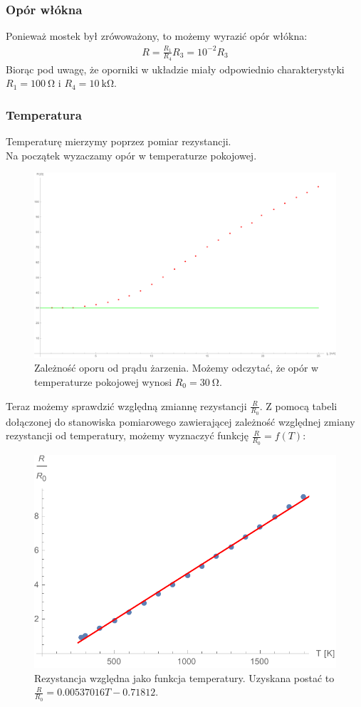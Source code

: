 \documentclass[paper=a4, fontsize=12pt]{scrartcl}
\begin{document}
\subsubsection{Opór włókna}
Ponieważ mostek był zrówoważony, to możemy wyrazić opór włókna:
\begin{align*}
R=\frac{R_1}{R_4}R_3=10^{-2}R_3
\end{align*}
Biorąc pod uwagę, że oporniki w układzie miały odpowiednio charakterystyki $R_1=100\:\mathrm{\Omega}$ i $R_4=10\:\mathrm{k\Omega}$.
\subsubsection{Temperatura}
Temperaturę mierzymy poprzez pomiar rezystancji.\\
Na początek wyzaczamy opór w temperaturze pokojowej.
\begin{figure}
\centering
\includegraphics[width=0.9\linewidth]{rid}
\caption{Zależność oporu od prądu żarzenia. Możemy odczytać, że opór w temperaturze pokojowej wynosi $R_0=30\:\mathrm{\Omega}$.}
\label{fig:rid}
\end{figure}
Teraz możemy sprawdzić względną zmiannę rezystancji $\frac{R}{R_0}$. Z pomocą tabeli dołączonej do stanowiska pomiarowego zawierającej zależność względnej zmiany rezystancji od temperatury, możemy wyznaczyć funkcję $\frac{R}{R_0}=f(T)$:
\begin{figure}[h!]
\centering
\includegraphics[width=0.6\linewidth]{temp}
\caption{Rezystancja względna jako funkcja temperatury. \newline
	Uzyskana postać to $\frac{R}{R_0}=0.00537016T-0.71812$.}
\label{fig:temp}
\end{figure}\clearpage
\end{document}
